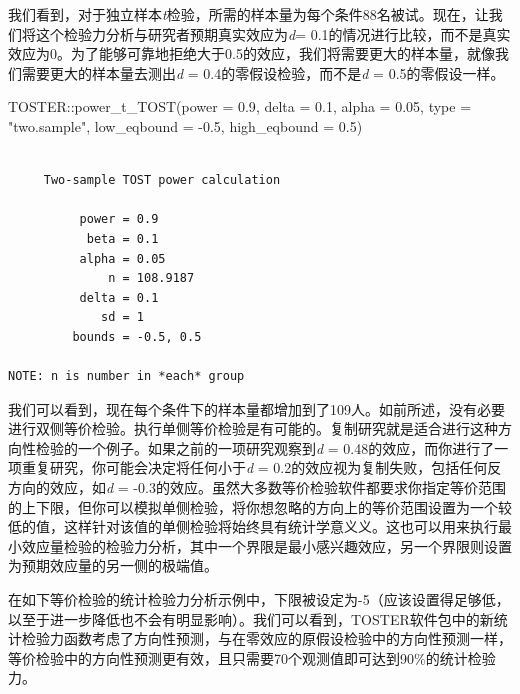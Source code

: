 \documentclass[
  letterpaper,
  DIV=11,
  numbers=noendperiod]{scrreprt}
\newenvironment{Shaded}{\begin{snugshade}}{\end{snugshade}}
\newcommand{\AttributeTok}[1]{\textcolor[rgb]{0.40,0.45,0.13}{#1}}
\newcommand{\FloatTok}[1]{\textcolor[rgb]{0.68,0.00,0.00}{#1}}
\newcommand{\FunctionTok}[1]{\textcolor[rgb]{0.28,0.35,0.67}{#1}}
\newcommand{\NormalTok}[1]{\textcolor[rgb]{0.00,0.23,0.31}{#1}}
\newcommand{\SpecialCharTok}[1]{\textcolor[rgb]{0.37,0.37,0.37}{#1}}
\newcommand{\StringTok}[1]{\textcolor[rgb]{0.13,0.47,0.30}{#1}}
\begin{document}
我们看到，对于独立样本\emph{t}检验，所需的样本量为每个条件88名被试。现在，让我们将这个检验力分析与研究者预期真实效应为\emph{d}=
0.1的情况进行比较，而不是真实效应为0。为了能够可靠地拒绝大于0.5的效应，我们将需要更大的样本量，就像我们需要更大的样本量去测出\emph{d}
= 0.4的零假设检验，而不是\emph{d} = 0.5的零假设一样。

\begin{Shaded}
\begin{Highlighting}[]
\NormalTok{TOSTER}\SpecialCharTok{::}\FunctionTok{power\_t\_TOST}\NormalTok{(}\AttributeTok{power =} \FloatTok{0.9}\NormalTok{, }\AttributeTok{delta =} \FloatTok{0.1}\NormalTok{,}
                     \AttributeTok{alpha =} \FloatTok{0.05}\NormalTok{, }\AttributeTok{type =} \StringTok{"two.sample"}\NormalTok{,}
                     \AttributeTok{low\_eqbound =} \SpecialCharTok{{-}}\FloatTok{0.5}\NormalTok{, }\AttributeTok{high\_eqbound =} \FloatTok{0.5}\NormalTok{)}
\end{Highlighting}
\end{Shaded}

\begin{verbatim}

     Two-sample TOST power calculation 

          power = 0.9
           beta = 0.1
          alpha = 0.05
              n = 108.9187
          delta = 0.1
             sd = 1
         bounds = -0.5, 0.5

NOTE: n is number in *each* group
\end{verbatim}

我们可以看到，现在每个条件下的样本量都增加到了109人。如前所述，没有必要进行双侧等价检验。执行单侧等价检验是有可能的。复制研究就是适合进行这种方向性检验的一个例子。如果之前的一项研究观察到\emph{d}
= 0.48的效应，而你进行了一项重复研究，你可能会决定将任何小于\emph{d} =
0.2的效应视为复制失败，包括任何反方向的效应，如\emph{d} =
-0.3的效应。虽然大多数等价检验软件都要求你指定等价范围的上下限，但你可以模拟单侧检验，将你想忽略的方向上的等价范围设置为一个较低的值，这样针对该值的单侧检验将始终具有统计学意义义。这也可以用来执行最小效应量检验的检验力分析，其中一个界限是最小感兴趣效应，另一个界限则设置为预期效应量的另一侧的极端值。

在如下等价检验的统计检验力分析示例中，下限被设定为-5（应该设置得足够低，以至于进一步降低也不会有明显影响）。我们可以看到，TOSTER软件包中的新统计检验力函数考虑了方向性预测，与在零效应的原假设检验中的方向性预测一样，等价检验中的方向性预测更有效，且只需要70个观测值即可达到90\%的统计检验力。
\end{document}
